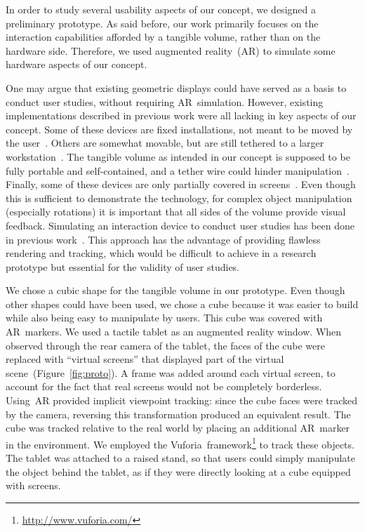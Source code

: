 \documentclass{vgtc}                         \havecopyrightspacefalse
\begin{document}
In order to study several usability aspects of our concept, we designed a preliminary prototype. As said before, our work primarily focuses on the interaction capabilities afforded by a tangible volume, rather than on the hardware side. Therefore, we used augmented reality~(AR) to simulate some hardware aspects of our concept.

One may argue that existing geometric displays could have served as a basis to conduct user studies, without requiring AR~simulation. However, existing implementations described in previous work were all lacking in key aspects of our concept. Some of these devices are fixed installations, not meant to be moved by the user~\cite{inami97}. Others are somewhat movable, but are still tethered to a larger workstation~\mbox{\cite{lopez-gulliver09,stavness10}}. The tangible volume as intended in our concept is supposed to be fully portable and self-contained, and a tether wire could hinder manipulation~\cite{hinckley97}. Finally, some of these devices are only partially covered in screens~\cite{stavness10,stavness06}. Even though this is sufficient to demonstrate the technology, for complex object manipulation (especially rotations) it is important that all sides of the volume provide visual feedback. Simulating an interaction device to conduct user studies has been done in previous work~\cite{baricevic12}. This approach has the advantage of providing flawless rendering and tracking, which would be difficult to achieve in a research prototype but essential for the validity of user studies.

We chose a cubic shape for the tangible volume in our prototype. Even though other shapes could have been used, we chose a cube because it was easier to build while also being easy to manipulate by users. This cube was covered with AR~markers. We used a tactile tablet as an augmented reality window. When observed through the rear camera of the tablet, the faces of the cube were replaced with ``virtual screens'' that displayed part of the virtual scene~(Figure~\ref{fig:proto}). A frame was added around each virtual screen, to account for the fact that real screens would not be completely borderless. Using~AR provided implicit viewpoint tracking: since the cube faces were tracked by the camera, reversing this transformation produced an equivalent result. The cube was tracked relative to the real world by placing an additional AR~marker in the environment. We employed the Vuforia~framework\footnote{\url{http://www.vuforia.com/}} to track these objects. The tablet was attached to a raised stand, so that users could simply manipulate the object behind the tablet, as if they were directly looking at a cube equipped with screens.
\end{document}
